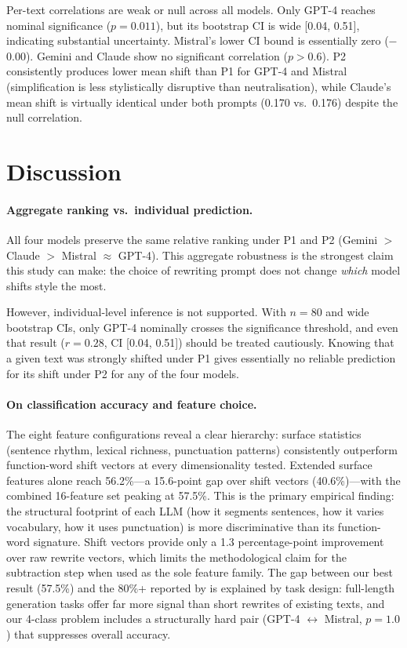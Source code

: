 \documentclass[11pt,a4paper]{article}
\begin{document}
Per-text correlations are weak or null across all models.
Only GPT-4 reaches nominal significance ($p = 0.011$), but its
bootstrap CI is wide [0.04, 0.51], indicating substantial uncertainty.
Mistral's lower CI bound is essentially zero ($-$0.00).
Gemini and Claude show no significant correlation ($p > 0.6$).
P2 consistently produces lower mean shift than P1 for GPT-4 and Mistral
(simplification is less stylistically disruptive than neutralisation),
while Claude's mean shift is virtually identical under both prompts
(0.170 vs.\ 0.176) despite the null correlation.

\section{Discussion}

\paragraph{Aggregate ranking vs.\ individual prediction.}
All four models preserve the same relative ranking under P1 and P2
(Gemini $>$ Claude $>$ Mistral $\approx$ GPT-4).
This aggregate robustness is the strongest claim this study can make:
the choice of rewriting prompt does not change \emph{which} model
shifts style the most.

However, individual-level inference is not supported.
With $n = 80$ and wide bootstrap CIs, only GPT-4 nominally crosses
the significance threshold, and even that result ($r = 0.28$,
CI [0.04, 0.51]) should be treated cautiously.
Knowing that a given text was strongly shifted under P1 gives
essentially no reliable prediction for its shift under P2
for any of the four models.

\paragraph{On classification accuracy and feature choice.}
The eight feature configurations reveal a clear hierarchy:
surface statistics (sentence rhythm, lexical richness, punctuation
patterns) consistently outperform function-word shift vectors at every
dimensionality tested.
Extended surface features alone reach 56.2\%---a 15.6-point gap over
shift vectors (40.6\%)---with the combined 16-feature set peaking at
57.5\%.
This is the primary empirical finding: the structural footprint of each
LLM (how it segments sentences, how it varies vocabulary, how it uses
punctuation) is more discriminative than its function-word signature.
Shift vectors provide only a 1.3 percentage-point improvement over
raw rewrite vectors, which limits the methodological claim for the
subtraction step when used as the sole feature family.
The gap between our best result (57.5\%) and the 80\%+ reported
by \citet{uchendu2023} is explained by task design:
full-length generation tasks offer far more signal than short rewrites
of existing texts, and our 4-class problem includes a structurally
hard pair (GPT-4 $\leftrightarrow$ Mistral, $p = 1.0$) that
suppresses overall accuracy.
\end{document}
